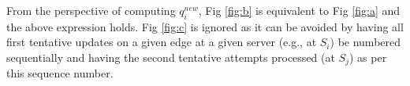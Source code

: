 From the perspective of computing $q^{new}_{i}$, Fig \ref{fig:b} is equivalent to Fig \ref{fig:a} and the above expression holds.  
Fig \ref{fig:c} is ignored as it can be avoided by having all first tentative updates on a given edge at a given server (e.g., at $S_i$) be numbered sequentially and having the second tentative attempts  processed (at $S_j$) as per this sequence number. 








